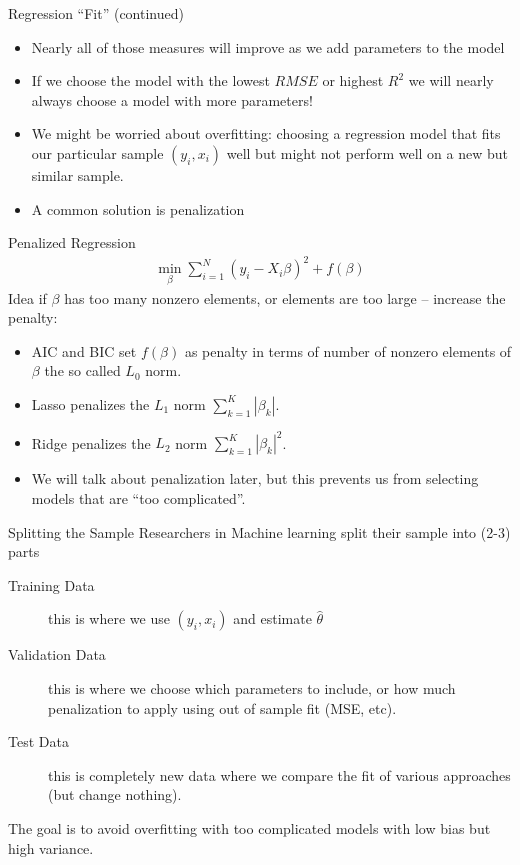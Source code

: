 \documentclass[aspectratio=169]{beamer}
\begin{document}
\begin{frame}{Regression ``Fit'' (continued)}
\begin{itemize}
\item Nearly all of those measures will improve as we add parameters to the model
\item If we choose the model with the lowest $RMSE$ or highest $R^2$ we will nearly always choose a model with more parameters!
\item We might be worried about \alert{overfitting}: choosing a regression model that fits our particular sample $(y_i,x_i)$ well but might not perform well on a new but similar sample.
\item A common solution is \alert{penalization}
\end{itemize}
\end{frame}


\begin{frame}{Penalized Regression}
\begin{align*}
\min_{\beta} \sum_{i=1}^N (y_i - X_i \beta)^2 + f(\beta) 
\end{align*}
Idea if $\beta$ has too many nonzero elements, or elements are too large -- increase the penalty:
\begin{itemize}
\item AIC and BIC set $f(\beta)$ as penalty in terms of number of nonzero elements of $\beta$ the so called $L_0$ norm.
\item Lasso penalizes the $L_1$ norm $\sum_{k=1}^K | \beta_k|$.
\item Ridge penalizes the $L_2$ norm $\sum_{k=1}^K | \beta_k|^2$.
\item We will talk about penalization later, but this prevents us from selecting models that are ``too complicated''.
\end{itemize}
\end{frame}

\begin{frame}{Splitting the Sample}
Researchers in Machine learning split their sample into (2-3) parts
\begin{description}
\item[Training Data] this is where we use $(y_i,x_i)$ and estimate $\widehat{\theta}$
\item[Validation Data] this is where we choose which parameters to include, or how much penalization to apply using out of sample fit (MSE, etc).
\item[Test Data] this is completely new data where we compare the fit of various approaches (but change nothing).
\end{description}
The goal is to avoid \alert{overfitting} with too complicated models with  \alert{low bias} but \alert{high variance}.
\end{frame}
\end{document}
